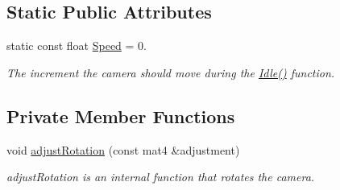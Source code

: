 \subsection*{\-Static \-Public \-Attributes}
\begin{DoxyCompactItemize}
\item 
static const float \hyperlink{class_camera_aedf8ba8b2af631a5a3e33b19bfa40322}{\-Speed} = 0.
\begin{DoxyCompactList}\small\item\em \-The increment the camera should move during the \hyperlink{class_camera_aec3559fe43597656629fdb00157d3c73}{\-Idle()} function. \end{DoxyCompactList}\end{DoxyCompactItemize}
\subsection*{\-Private \-Member \-Functions}
\begin{DoxyCompactItemize}
\item 
void \hyperlink{class_camera_a7ffc3619f9a5d8e586cb3d96ebdd3188}{adjust\-Rotation} (const mat4 \&adjustment)
\begin{DoxyCompactList}\small\item\em adjust\-Rotation is an internal function that rotates the camera. \end{DoxyCompactList}\end{DoxyCompactItemize}
